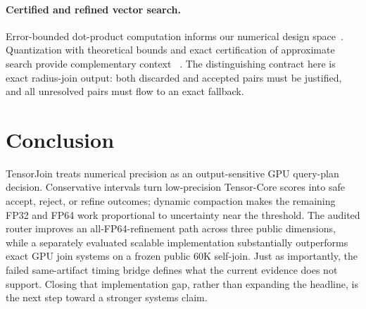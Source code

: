 \documentclass[sigconf,review,anonymous]{acmart}
\newcommand{\system}{TensorJoin\xspace}
\begin{document}
\paragraph{Certified and refined vector search.}
Error-bounded dot-product computation informs our numerical design
space~\cite{diffenderfer2022errorbounded}.  Quantization with theoretical bounds
and exact certification of approximate search provide complementary context
~\cite{gao2024rabitq,francois2019certified}.
The distinguishing contract here is exact radius-join output: both discarded
and accepted pairs must be justified, and all unresolved pairs must flow to an
exact fallback.

\section{Conclusion}

\system treats numerical precision as an output-sensitive GPU query-plan
decision.  Conservative intervals turn low-precision Tensor-Core scores into
safe accept, reject, or refine outcomes; dynamic compaction makes the remaining
FP32 and FP64 work proportional to uncertainty near the threshold.  The
audited router improves an all-FP64-refinement path across three public
dimensions, while a separately evaluated scalable implementation substantially
outperforms exact GPU join systems on a frozen public 60K self-join.  Just as
importantly, the failed same-artifact timing bridge defines what the current
evidence does not support.  Closing that implementation gap, rather than
expanding the headline, is the next step toward a stronger systems claim.



\end{document}
